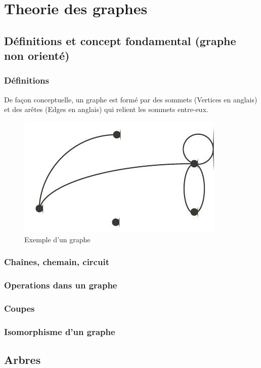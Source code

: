 \chapter{Theorie des graphes}
\section{Définitions et concept fondamental (graphe non orienté)}
\subsection{Définitions}
De façon conceptuelle, un graphe est formé par des sommets (Vertices en anglais) et des arêtes (Edges en anglais) 
qui relient les sommets entre-eux.

\begin{figure}[h]
\centering
\includegraphics[width=0.5\linewidth]{images/graph}
\caption[Exemple d'un graphe]{Exemple d'un graphe}
\label{fig:graph}
\end{figure}

\subsection{Chaînes, chemain, circuit}

\subsection{Operations dans un graphe}

\subsection{Coupes}

\subsection{Isomorphisme d'un graphe}


\section{Arbres}
